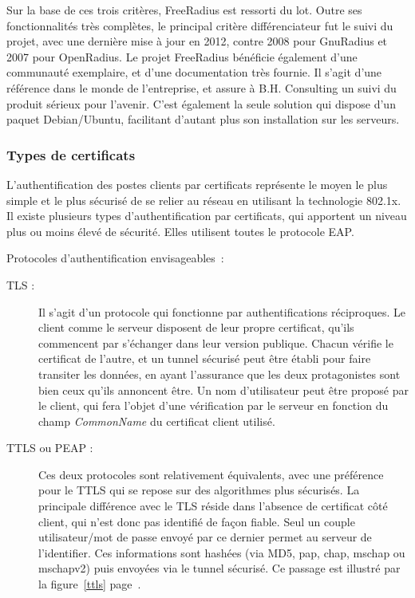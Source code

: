 Sur la base de ces trois critères, FreeRadius est ressorti du lot. Outre ses fonctionnalités très complètes, le principal critère différenciateur fut le suivi du projet, avec une dernière mise à jour en 2012, contre 2008 pour GnuRadius et 2007 pour OpenRadius. Le projet FreeRadius bénéficie également d'une communauté exemplaire, et d'une documentation très fournie. Il s'agit d'une référence dans le monde de l'entreprise, et assure à B.H. Consulting un suivi du produit sérieux pour l'avenir. C'est également la seule solution qui dispose d'un paquet Debian/Ubuntu, facilitant d'autant plus son installation sur les serveurs.

\subsubsection{Types de certificats}

L'authentification des postes clients par certificats représente le moyen le plus simple et le plus sécurisé de se relier au réseau en utilisant la technologie 802.1x. Il existe plusieurs types d'authentification par certificats, qui apportent un niveau plus ou moins élevé de sécurité. Elles utilisent toutes le protocole EAP.

Protocoles d'authentification envisageables~:

\begin{description}
\item[TLS :] Il s'agit d'un protocole qui fonctionne par authentifications réciproques. Le client comme le serveur disposent de leur propre certificat, qu'ils commencent par s'échanger dans leur version publique. Chacun vérifie le certificat de l'autre, et un tunnel sécurisé peut être établi pour faire transiter les données, en ayant l'assurance que les deux protagonistes sont bien ceux qu'ils annoncent être. Un nom d'utilisateur peut être proposé par le client, qui fera l'objet d'une vérification par le serveur en fonction du champ \textit{CommonName} du certificat client utilisé.
\item[TTLS ou PEAP :] Ces deux protocoles sont relativement équivalents, avec une préférence pour le TTLS qui se repose sur des algorithmes plus sécurisés. La principale différence avec le TLS réside dans l'absence de certificat côté client, qui n'est donc pas identifié de façon fiable. Seul un couple utilisateur/mot de passe envoyé par ce dernier permet au serveur de l'identifier. Ces informations sont hashées (via MD5, pap, chap, mschap ou mschapv2) puis envoyées via le tunnel sécurisé. Ce passage est illustré par la figure~\ref{ttls} page~\pageref{ttls}.
\end{description}

